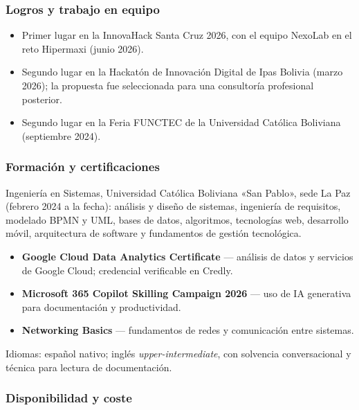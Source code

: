 \subsubsection{Logros y trabajo en equipo}

\begin{itemize}
  \item Primer lugar en la InnovaHack Santa Cruz 2026, con el equipo NexoLab en
        el reto Hipermaxi (junio 2026).
  \item Segundo lugar en la Hackatón de Innovación Digital de Ipas Bolivia (marzo
        2026); la propuesta fue seleccionada para una consultoría profesional
        posterior.
  \item Segundo lugar en la Feria FUNCTEC de la Universidad Católica Boliviana
        (septiembre 2024).
\end{itemize}

\subsubsection{Formación y certificaciones}

Ingeniería en Sistemas, Universidad Católica Boliviana «San Pablo», sede La Paz
(febrero 2024 a la fecha): análisis y diseño de sistemas, ingeniería de
requisitos, modelado BPMN y UML, bases de datos, algoritmos, tecnologías web,
desarrollo móvil, arquitectura de software y fundamentos de gestión tecnológica.

\begin{itemize}
  \item \textbf{Google Cloud Data Analytics Certificate} — análisis de datos y
        servicios de Google Cloud; credencial verificable en Credly.
  \item \textbf{Microsoft 365 Copilot Skilling Campaign 2026} — uso de IA
        generativa para documentación y productividad.
  \item \textbf{Networking Basics} — fundamentos de redes y comunicación entre
        sistemas.
\end{itemize}

Idiomas: español nativo; inglés \emph{upper-intermediate}, con solvencia
conversacional y técnica para lectura de documentación.

\subsubsection{Disponibilidad y coste}


